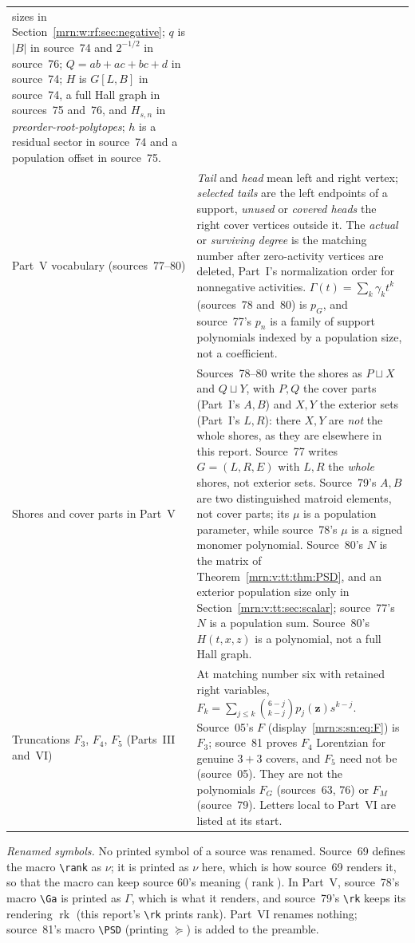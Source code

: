 \documentclass[11pt,a4paper]{article}
\theoremstyle{remark}\newtheorem{remark}[theorem]{Remark}
\newcommand{\rk}{\operatorname{rank}}      %
\newcommand{\rank}{\operatorname{rank}}    %
\newcommand{\PSD}{\succeq}                 %
\newcommand{\prp}{\emph{preorder-root-polytopes}}
\begin{document}
\begin{longtable}{>{\raggedright\arraybackslash}p{}>{\raggedright\arraybackslash}p{}}
sizes in Section~\ref{mrn:w:rf:sec:negative}; $q$ is $|B|$ in source~74
and $2^{-1/2}$ in source~76; $Q=ab+ac+bc+d$ in source~74; $H$ is $G[L,B]$
in source~74, a full Hall graph in sources~75 and~76, and $H_{s,n}$ in
\prp; $h$ is a residual sector in source~74 and a population offset in
source~75.\\
Part~V vocabulary (sources~77--80) &
\emph{Tail} and \emph{head} mean left and right vertex; \emph{selected tails}
are the left endpoints of a support, \emph{unused} or \emph{covered heads} the
right cover vertices outside it. The \emph{actual} or \emph{surviving degree}
is the matching number after zero-activity vertices are deleted, Part~I's
normalization order for nonnegative activities. $\Gamma(t)=\sum_k\gamma_kt^k$
(sources~78 and~80) is $p_G$, and source~77's $p_n$ is a family of support
polynomials indexed by a population size, not a coefficient.\\
Shores and cover parts in Part~V &
Sources~78--80 write the shores as $P\sqcup X$ and $Q\sqcup Y$, with $P,Q$
the cover parts (Part~I's $A,B$) and $X,Y$ the exterior sets (Part~I's $L,R$):
there $X,Y$ are \emph{not} the whole shores, as they are elsewhere in this
report. Source~77 writes $G=(L,R,E)$ with $L,R$ the \emph{whole} shores, not
exterior sets. Source~79's $A,B$ are two distinguished matroid elements, not
cover parts; its $\mu$ is a population parameter, while source~78's $\mu$ is a
signed monomer polynomial. Source~80's $N$ is the matrix of
Theorem~\ref{mrn:v:tt:thm:PSD}, and an exterior population size only in
Section~\ref{mrn:v:tt:sec:scalar}; source~77's $N$ is a population sum.
Source~80's $H(t,x,z)$ is a polynomial, not a full Hall graph.\\
Truncations $F_3$, $F_4$, $F_5$ (Parts~III and~VI) &
At matching number six with retained right variables,
$F_k=\sum_{j\le k}\binom{6-j}{k-j}p_j(\mathbf z)s^{k-j}$. Source~05's $F$
(display~\eqref{mrn:s:sn:eq:F}) is $F_3$; source~81 proves $F_4$ Lorentzian
for genuine $3+3$ covers, and $F_5$ need not be (source~05). They are not
the polynomials $F_G$ (sources~63, 76) or $F_M$ (source~79). Letters local
to Part~VI are listed at its start.\\
\end{longtable}

\emph{Renamed symbols.} No printed symbol of a source was renamed.
Source~69 defines the macro \verb|\rank| as $\nu$; it is printed as $\nu$
here, which is how source~69 renders it, so that the macro can keep source
60's meaning ($\operatorname{rank}$).
In Part~V, source~78's macro \verb|\Ga| is printed as $\Gamma$, which is what
it renders, and source~79's \verb|\rk| keeps its rendering
$\operatorname{rk}$ (this report's \verb|\rk| prints rank).
Part~VI renames nothing; source~81's macro \verb|\PSD| (printing $\succeq$)
is added to the preamble.
\end{document}
